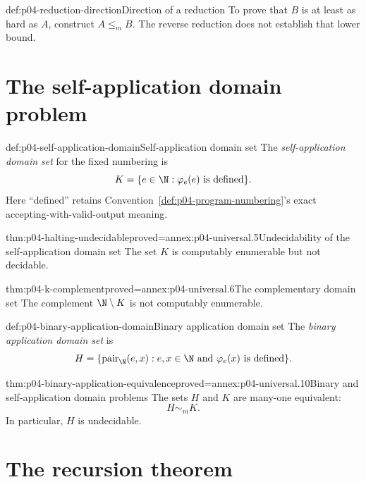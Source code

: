 \begin{hbwarning}{def:p04-reduction-direction}{Direction of a reduction}
To prove that \(B\) is at least as hard as \(A\), construct \(A\leq_m B\).
The reverse reduction does not establish that lower bound.
\end{hbwarning}

\section{The self-application domain problem}
\label{sec:p04-self-application}

\begin{hbdefinition}{def:p04-self-application-domain}{Self-application domain set}
The \emph{self-application domain set} for the fixed numbering is
\[
  K=\{e\in\N:\varphi_e(e)\text{ is defined}\}.
\]
Here ``defined'' retains Convention~\ref{def:p04-program-numbering}'s exact
accepting-with-valid-output meaning.
\end{hbdefinition}

\begin{hbtheorem}{thm:p04-halting-undecidable}{proved=annex:p04-universal.5}{Undecidability of the self-application domain set}
The set \(K\) is computably enumerable but not decidable.
\end{hbtheorem}

\begin{hbcorollary}{thm:p04-k-complement}{proved=annex:p04-universal.6}{The complementary domain set}
The complement \(\N\setminus K\) is not computably enumerable.
\end{hbcorollary}

\begin{hbdefinition}{def:p04-binary-application-domain}{Binary application domain set}
The \emph{binary application domain set} is
\[
  H=\{\operatorname{pair}_{\N}(e,x):e,x\in\N
       \text{ and }\varphi_e(x)\text{ is defined}\}.
\]
\end{hbdefinition}

\begin{hbcorollary}{thm:p04-binary-application-equivalence}{proved=annex:p04-universal.10}{Binary and self-application domain problems}
The sets \(H\) and \(K\) are many-one equivalent:
\[
  H\sim_m K.
\]
In particular, \(H\) is undecidable.
\end{hbcorollary}

\section{The recursion theorem}
\label{sec:p04-recursion-theorem}

